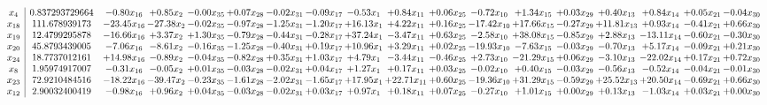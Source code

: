 \documentclass[9pt]{article}
\begin{document}
 \[\begin{array}{c| c c@{\hskip 2pt} c@{\hskip 2pt} c@{\hskip 2pt} c@{\hskip 2pt} c@{\hskip 2pt} c@{\hskip 2pt} c@{\hskip 2pt} c@{\hskip 2pt} c@{\hskip 2pt} c@{\hskip 2pt} c@{\hskip 2pt} c@{\hskip 2pt} c@{\hskip 2pt} c@{\hskip 2pt} c@{\hskip 2pt} c@{\hskip 2pt} }
 x_{4}   &  0.837293729664 & -0.80 x_{16} & +  0.85 x_{2} & -0.00 x_{35} & +  0.07 x_{28} & -0.02 x_{31} & -0.09 x_{17} & -0.53 x_{1} & +  0.84 x_{11} & +  0.06 x_{25} & -0.72 x_{10} & +  1.34 x_{15} & +  0.03 x_{29} & +  0.40 x_{13} & +  0.84 x_{14} & +  0.05 x_{21} & -0.04 x_{30}\\
 x_{18}   &  111.678939173 & -23.45 x_{16} & -27.38 x_{2} & -0.02 x_{35} & -0.97 x_{28} & -1.25 x_{31} & -1.20 x_{17} & + 16.13 x_{1} & +  4.22 x_{11} & +  0.16 x_{25} & -17.42 x_{10} & + 17.66 x_{15} & -0.27 x_{29} & + 11.81 x_{13} & +  0.93 x_{14} & -0.41 x_{21} & +  0.66 x_{30}\\
 x_{19}   &  12.4799295878 & -16.66 x_{16} & +  3.37 x_{2} & +  1.30 x_{35} & -0.79 x_{28} & -0.44 x_{31} & -0.28 x_{17} & + 37.24 x_{1} & -3.47 x_{11} & +  0.63 x_{25} & -2.58 x_{10} & + 38.08 x_{15} & -0.85 x_{29} & +  2.88 x_{13} & -13.11 x_{14} & -0.60 x_{21} & -0.30 x_{30}\\
 x_{20}   &  45.8793439005 & -7.06 x_{16} & -8.61 x_{2} & -0.16 x_{35} & -1.25 x_{28} & -0.40 x_{31} & +  0.19 x_{17} & + 10.96 x_{1} & +  3.29 x_{11} & +  0.02 x_{25} & -19.93 x_{10} & -7.63 x_{15} & -0.03 x_{29} & -0.70 x_{13} & +  5.17 x_{14} & -0.09 x_{21} & +  0.21 x_{30}\\
 x_{24}   &  18.7737012161 & + 14.98 x_{16} & -0.89 x_{2} & -0.04 x_{35} & -0.82 x_{28} & +  0.35 x_{31} & +  1.03 x_{17} & +  4.79 x_{1} & -3.44 x_{11} & -0.46 x_{25} & +  2.73 x_{10} & -21.29 x_{15} & +  0.06 x_{29} & -3.10 x_{13} & -22.02 x_{14} & +  0.17 x_{21} & +  0.72 x_{30}\\
 x_{8}   &  1.95974917007 & -0.31 x_{16} & -0.05 x_{2} & +  0.01 x_{35} & -0.03 x_{28} & -0.02 x_{31} & +  0.04 x_{17} & +  1.27 x_{1} & +  0.17 x_{11} & +  0.03 x_{25} & -0.02 x_{10} & +  0.40 x_{15} & -0.03 x_{29} & -0.56 x_{13} & -0.52 x_{14} & -0.04 x_{21} & -0.01 x_{30}\\
 x_{23}   &  72.9210484516 & -18.22 x_{16} & -39.47 x_{2} & -0.23 x_{35} & -1.61 x_{28} & -2.02 x_{31} & -1.65 x_{17} & + 17.95 x_{1} & + 22.71 x_{11} & +  0.60 x_{25} & -19.36 x_{10} & + 31.29 x_{15} & -0.59 x_{29} & + 25.52 x_{13} & + 20.50 x_{14} & -0.69 x_{21} & +  0.66 x_{30}\\
 x_{12}   &  2.90032400419 & -0.98 x_{16} & +  0.96 x_{2} & +  0.04 x_{35} & -0.03 x_{28} & -0.02 x_{31} & +  0.03 x_{17} & +  0.97 x_{1} & +  0.18 x_{11} & +  0.07 x_{25} & -0.27 x_{10} & +  1.01 x_{15} & +  0.00 x_{29} & +  0.13 x_{13} & -1.03 x_{14} & +  0.03 x_{21} & +  0.00 x_{30}\\

\end{array}\]
\end{document}
